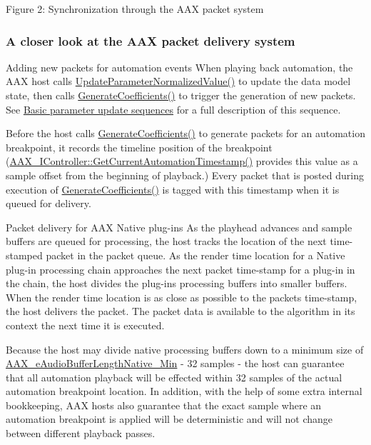  Figure 2\+: Synchronization through the A\+A\+X packet system\hypertarget{a00351_parameterUpdateTiming_packet_delivery}{}\subsubsection{A closer look at the A\+A\+X packet delivery system}\label{a00351_parameterUpdateTiming_packet_delivery}
\begin{DoxyParagraph}{Adding new packets for automation events}
When playing back automation, the A\+A\+X host calls \hyperlink{a00061_a685858711efb8634ce66c327f2865c71}{Update\+Parameter\+Normalized\+Value()} to update the data model state, then calls \hyperlink{a00061_a083265b008921b6114ede387711694b7}{Generate\+Coefficients()} to trigger the generation of new packets. See \hyperlink{a00353}{Basic parameter update sequences} for a full description of this sequence.

Before the host calls \hyperlink{a00061_a083265b008921b6114ede387711694b7}{Generate\+Coefficients()} to generate packets for an automation breakpoint, it records the timeline position of the breakpoint (\hyperlink{a00090_af9ab9b228023e116f89249a56c27a20f}{A\+A\+X\+\_\+\+I\+Controller\+::\+Get\+Current\+Automation\+Timestamp()} provides this value as a sample offset from the beginning of playback.) Every packet that is posted during execution of \hyperlink{a00061_a083265b008921b6114ede387711694b7}{Generate\+Coefficients()} is tagged with this timestamp when it is queued for delivery. 
\end{DoxyParagraph}


\begin{DoxyParagraph}{Packet delivery for A\+A\+X Native plug-\/ins}
As the playhead advances and sample buffers are queued for processing, the host tracks the location of the next time-\/stamped packet in the packet queue. As the render time location for a Native plug-\/in processing chain approaches the next packet time-\/stamp for a plug-\/in in the chain, the host divides the plug-\/in\textquotesingle{}s processing buffers into smaller buffers. When the render time location is as close as possible to the packet\textquotesingle{}s time-\/stamp, the host delivers the packet. The packet data is available to the algorithm in its context the next time it is executed.

Because the host may divide native processing buffers down to a minimum size of \hyperlink{a00206_aa1769ee466fd07659d8c7ef5ac61cd49a5819a4956c053084b094f686c920598e}{A\+A\+X\+\_\+e\+Audio\+Buffer\+Length\+Native\+\_\+\+Min} -\/ 32 samples -\/ the host can guarantee that all automation playback will be effected within 32 samples of the actual automation breakpoint location. In addition, with the help of some extra internal bookkeeping, A\+A\+X hosts also guarantee that the exact sample where an automation breakpoint is applied will be deterministic and will not change between different playback passes. 
\end{DoxyParagraph}


